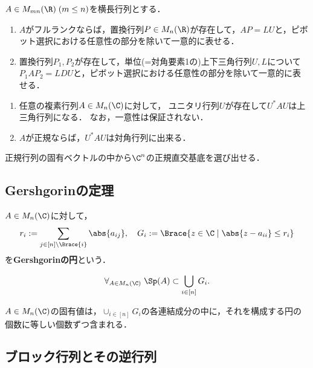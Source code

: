 \documentclass[uplatex, dvipdfmx]{jsreport}
\begin{document}
\begin{proposition}[$LU$-分解]
    $A\in M_{mn}(\R)\;(m\le n)$を横長行列とする．
    \begin{enumerate}
        \item $A$がフルランクならば，置換行列$P\in M_n(\R)$が存在して，$AP=LU$と，ピボット選択における任意性の部分を除いて一意的に表せる．
        \item 置換行列$P_1,P_2$が存在して，単位(=対角要素1の)上下三角行列$U,L$について$P_1AP_2=LDU$と，ピボット選択における任意性の部分を除いて一意的に表せる．
    \end{enumerate}
\end{proposition}
    
\begin{theorem}\mbox{}
    \begin{enumerate}
        \item 任意の複素行列$A\in M_n(\C)$に対して，
        ユニタリ行列$U$が存在して$U^*AU$は上三角行列になる．
        なお，一意性は保証されない．
        \item $A$が正規ならば，$U^*AU$は対角行列に出来る．
    \end{enumerate}
\end{theorem}
\begin{remarks}
    正規行列の固有ベクトルの中から$\C^n$の正規直交基底を選び出せる．
\end{remarks}

\subsection{Gershgorinの定理}

\begin{definition}
    $A\in M_n(\C)$に対して，
    \[r_i:=\sum_{j\in[n]\setminus\Brace{i}}\abs{a_{ij}},\quad G_i:=\Brace{z\in\C\mid\abs{z-a_{ii}}\le r_i}\]
    を\textbf{Gershgorinの円}という．
\end{definition}

\begin{theorem}[Gershgorin]
    \[\forall_{A\in M_n(\C)}\;\Sp(A)\subset \bigcup_{i\in[n]}G_i.\]
\end{theorem}

\begin{proposition}
    $A\in M_n(\C)$の固有値は，$\cup_{i\in[n]}G_i$の各連結成分の中に，それを構成する円の個数に等しい個数ずつ含まれる．
\end{proposition}

\subsection{ブロック行列とその逆行列}
\end{document}
